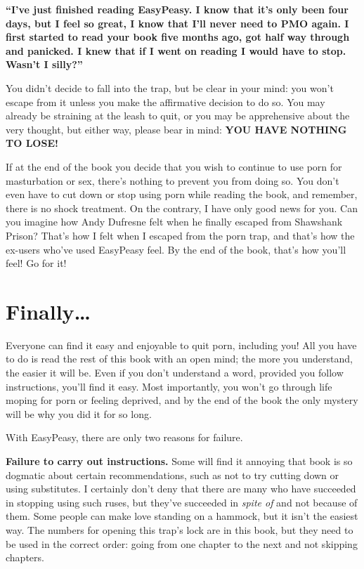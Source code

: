 \documentclass[
]{book}
\begin{document}
\textbf{``I've just finished reading EasyPeasy. I know that it's only been four days, but I feel so great, I know that I'll never need to PMO again. I first started to read your book five months ago, got half way through and panicked. I knew that if I went on reading I would have to stop. Wasn't I silly?''}

You didn't decide to fall into the trap, but be clear in your mind: you won't escape from it unless you make the affirmative decision to do so. You may already be straining at the leash to quit, or you may be apprehensive about the very thought, but either way, please bear in mind: \textbf{YOU HAVE NOTHING TO LOSE!}

If at the end of the book you decide that you wish to continue to use porn for masturbation or sex, there's nothing to prevent you from doing so. You don't even have to cut down or stop using porn while reading the book, and remember, there is no shock treatment. On the contrary, I have only good news for you. Can you imagine how Andy Dufresne felt when he finally escaped from Shawshank Prison? That's how I felt when I escaped from the porn trap, and that's how the ex-users who've used EasyPeasy feel. By the end of the book, that's how you'll feel! Go for it!

\hypertarget{finally}{%
\section*{Finally\ldots{}}\label{finally}}

Everyone can find it easy and enjoyable to quit porn, including you! All you have to do is read the rest of this book with an open mind; the more you understand, the easier it will be. Even if you don't understand a word, provided you follow instructions, you'll find it easy. Most importantly, you won't go through life moping for porn or feeling deprived, and by the end of the book the only mystery will be why you did it for so long.

With EasyPeasy, there are only two reasons for failure.

\textbf{Failure to carry out instructions.}
Some will find it annoying that book is so dogmatic about certain recommendations, such as not to try cutting down or using substitutes. I certainly don't deny that there are many who have succeeded in stopping using such ruses, but they've succeeded in \emph{spite of} and not because of them. Some people can make love standing on a hammock, but it isn't the easiest way. The numbers for opening this trap's lock are in this book, but they need to be used in the correct order: going from one chapter to the next and not skipping chapters.
\end{document}

